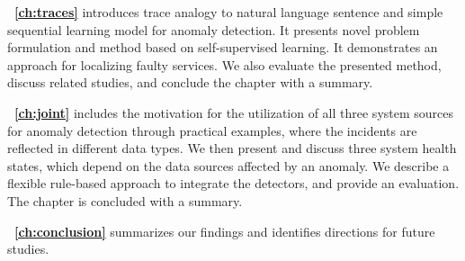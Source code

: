 \textbf{~\autoref{ch:traces}} introduces trace analogy to natural language sentence and simple sequential learning model for anomaly detection. It presents novel problem formulation and method based on self-supervised learning. It demonstrates an approach for localizing faulty services. We also evaluate the presented method, discuss related studies, and conclude the chapter with a summary.

\textbf{~\autoref{ch:joint}} includes the motivation for the utilization of all three system sources for anomaly detection through practical examples, where the incidents are reflected in different data types. We then present and discuss three system health states, which depend on the data sources affected by an anomaly. We describe a flexible rule-based approach to integrate the detectors, and provide an evaluation. The chapter is concluded with a summary. 

 \textbf{~\autoref{ch:conclusion}} summarizes our findings and identifies directions for future studies.